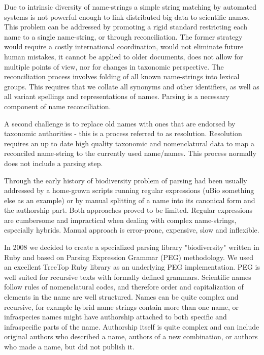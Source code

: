 \documentclass{bmcart}
\begin{document}
Due to intrinsic diversity of name-strings a simple string matching by
automated systems is not powerful enough to link distributed big data to
scientific names. This problem can be addressed by promoting a rigid standard
restricting each name to a single name-string, or through reconciliation. The
former strategy would require a costly international coordination, would not
eliminate future human mistakes, it cannot be applied to older documents, does
not allow for multiple points of view, nor for changes in taxonomic
perspective.  The reconciliation process involves folding of all known
name-strings into lexical groups.  This requires that we collate all synonyms
and other identifiers, as well as all variant spellings and representations of
names. Parsing is a necessary component of name reconciliation. 

A second challenge is to replace old names with ones that are endorsed by
taxonomic authorities - this is a process referred to as resolution. Resolution
requires an up to date high quality taxonomic and nomenclatural data to map a
reconciled name-string to the currently used name/names. This process normally
does not include a parsing step. 

Through the early history of biodiversity problem of parsing had been usually
addressed by a home-grown scripts running regular expressions (uBio something
else as an example) or by manual splitting of a name into its canonical form
and the authorship part. Both approaches proved to be limited. Regular
expressions are cumbersome and impractical when dealing with complex
name-strings, especially hybrids. Manual approach is error-prone, expensive,
slow and inflexible.  

In 2008 we decided to create a specialized parsing library "biodiversity"
written in Ruby and based on Parsing Expression Grammar (PEG) methodology. We
used an excellent TreeTop Ruby library as an underlying PEG implementation. PEG
is well suited for recursive texts with formally defined grammars. Scientific
names follow rules of nomenclatural codes, and therefore order and
capitalization of elements in the name are well structured. Names can be quite
complex and recursive, for example hybrid name strings contain more than one
name, or infraspecies names might have authorship attached to both specific and
infraspecific parts of the name. Authorship itself is quite complex and can
include original authors who described a name, authors of a new combination, or
authors who made a name, but did not publish it.  
\end{document}
